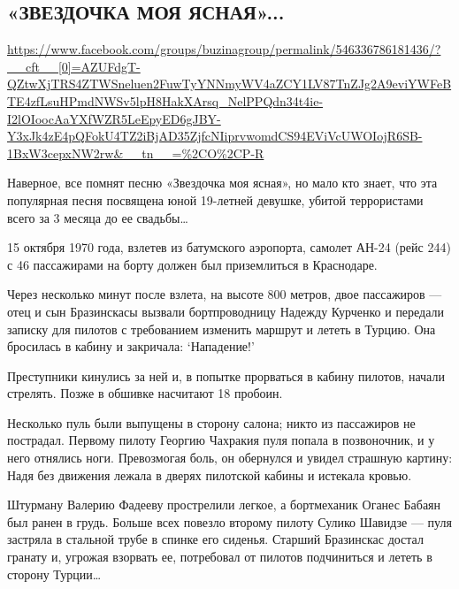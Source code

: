  
 

\subsection{«ЗВЕЗДОЧКА МОЯ ЯСНАЯ»... }
\label{sec:15_10_2020.fb.buzina.1.zvezdochka_moja_jasnaja}
\url{https://www.facebook.com/groups/buzinagroup/permalink/546336786181436/?__cft__[0]=AZUFdgT-QZtwXjTRS4ZTWSneluen2FuwTyYNNmyWV4aZCY1LV87TnZJg2A9eviYWFeBTE4zfLsuHPmdNWSv5lpH8HakXArsq_NelPPQdn34t4ie-I2lOIoocAaYXfWZR5LeEpyED6gJBY-Y3xJk4zE4pQFokU4TZ2iBjAD35ZjfcNIiprvwomdCS94EViVcUWOIojR6SB-1BxW3cepxNW2rw&__tn__=%2CO%2CP-R}

Наверное, все помнят песню «Звездочка моя ясная», но мало кто знает, что эта
популярная песня посвящена юной 19-летней девушке, убитой террористами всего за
3 месяца до ее свадьбы…

15 октября 1970 года, взлетев из батумского аэропорта, самолет АН-24 (рейс 244)
с 46 пассажирами на борту должен был приземлиться в Краснодаре.

Через несколько минут после взлета, на высоте 800 метров, двое пассажиров —
отец и сын Бразинскасы вызвали бортпроводницу Надежду Курченко и передали
записку для пилотов с требованием изменить маршрут и лететь в Турцию. Она
бросилась в кабину и закричала: ‘Нападение!’

Преступники кинулись за ней и, в попытке прорваться в кабину пилотов, начали
стрелять. Позже в обшивке насчитают 18 пробоин.

Несколько пуль были выпущены в сторону салона; никто из пассажиров не
пострадал. Первому пилоту Георгию Чахракия пуля попала в позвоночник, и у него
отнялись ноги.  Превозмогая боль, он обернулся и увидел страшную картину: Надя
без движения лежала в дверях пилотской кабины и истекала кровью.

Штурману Валерию Фадееву прострелили легкое, а бортмеханик Оганес Бабаян был
ранен в грудь. Больше всех повезло второму пилоту Сулико Шавидзе --- пуля
застряла в стальной трубе в спинке его сиденья.  Старший Бразинскас достал
гранату и, угрожая взорвать ее, потребовал от пилотов подчиниться и лететь в
сторону Турции…

